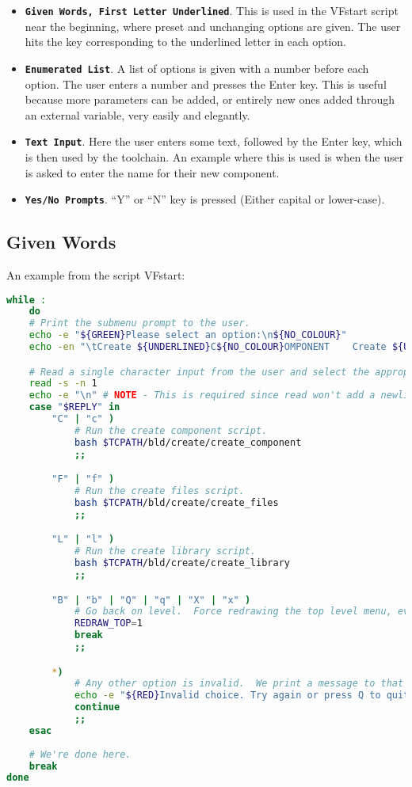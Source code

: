 \documentclass[a4paper, oneside, 11pt, titlepage, onecolumn, openright]{report}
\begin{document}
\begin{itemize}

\item \textbf{\texttt{Given Words, First Letter Underlined}}. This is used in the VFstart script near the beginning, where preset and unchanging options are given. The user hits the key corresponding to the underlined letter in each option. 

\item \textbf{\texttt{Enumerated List}}. A list of options is given with a number before each option. The user enters a number and presses the Enter key. This is useful because more parameters can be added, or entirely new ones added through an external variable, very easily and elegantly.

\item \textbf{\texttt{Text Input}}. Here the user enters some text, followed by the Enter key, which is then used by the toolchain. An example where this is used is when the user is asked to enter the name for their new component.

\item \textbf{\texttt{Yes/No Prompts}}. ``Y'' or ``N'' key is pressed (Either capital or lower-case).
\end{itemize}			
			
\subsection{Given Words}
			\label{ss:GivenWords}
			An example from the script VFstart:
			
\begin{lstlisting}[frame=trBL, breaklines=true, language = bash]
while :
	do
	# Print the submenu prompt to the user.
	echo -e "${GREEN}Please select an option:\n${NO_COLOUR}"
	echo -en "\tCreate ${UNDERLINED}C${NO_COLOUR}OMPONENT    Create ${UNDERLINED}F${NO_COLOUR}ILES    Create ${UNDERLINED}L${NO_COLOUR}IBRARY    ${UNDERLINED}B${NO_COLOUR}ACK"

	# Read a single character input from the user and select the appropriate response.
	read -s -n 1
	echo -e "\n" # NOTE - This is required since read won't add a newline after reading a single character.
	case "$REPLY" in
		"C" | "c" )
			# Run the create component script.
			bash $TCPATH/bld/create/create_component
			;;

		"F" | "f" )
			# Run the create files script.
			bash $TCPATH/bld/create/create_files
			;;

		"L" | "l" )
			# Run the create library script.
			bash $TCPATH/bld/create/create_library
			;;

		"B" | "b" | "Q" | "q" | "X" | "x" )
			# Go back on level.  Force redrawing the top level menu, even if we aren't in block mode.
			REDRAW_TOP=1
			break
			;;

		*)
			# Any other option is invalid.  We print a message to that effect and try again.
			echo -e "${RED}Invalid choice. Try again or press Q to quit.\n${NO_COLOUR}"
			continue
			;;
	esac
				
	# We're done here.
	break
done		        
\end{lstlisting}
\end{document}

